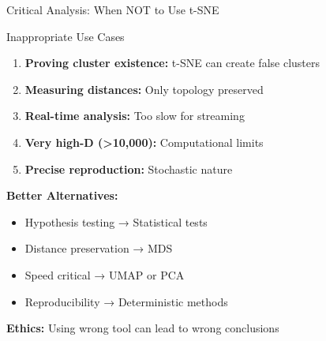 \documentclass[aspectratio=169]{beamer}
\newcommand{\ethics}[1]{\colorbox{purple!10}{\textcolor{ethicscolor}{\textbf{Ethics:} #1}}}
\begin{document}
\begin{frame}{Critical Analysis: When NOT to Use t-SNE}
\begin{block}{Inappropriate Use Cases}
\begin{enumerate}
\item \textbf{Proving cluster existence:} t-SNE can create false clusters
\item \textbf{Measuring distances:} Only topology preserved
\item \textbf{Real-time analysis:} Too slow for streaming
\item \textbf{Very high-D (>10,000):} Computational limits
\item \textbf{Precise reproduction:} Stochastic nature
\end{enumerate}
\end{block}

\textbf{Better Alternatives:}
\begin{itemize}
\item Hypothesis testing → Statistical tests
\item Distance preservation → MDS
\item Speed critical → UMAP or PCA
\item Reproducibility → Deterministic methods
\end{itemize}

\vspace{0.2cm}
\ethics{Using wrong tool can lead to wrong conclusions}
\end{frame}
\end{document}
